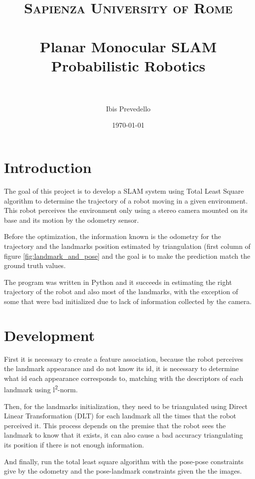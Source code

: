 \documentclass{article}
\title{
\normalfont \normalsize
\textsc{Sapienza University of Rome} \\ [25pt]
\horrule{0.5pt} \\[0.4cm] %
\LARGE Planar Monocular SLAM \\
\large Probabilistic Robotics \\
\horrule{2pt} \\[0.5cm] %
}
\author{Ibis Prevedello}
\date{\normalsize\today}
\begin{document}
\maketitle


\section{Introduction}
The goal of this project is to develop a SLAM system using Total Least Square algorithm to determine the trajectory of a robot moving in a given environment. This robot perceives the environment only using a stereo camera mounted on its base and its motion by the odometry sensor.

Before the optimization, the information known is the odometry for the trajectory and the landmarks position estimated by triangulation (first column of figure \ref{fig:landmark_and_pose} and the goal is to make the prediction match the ground truth values.

The program was written in Python and it succeeds in estimating the right trajectory of the robot and also most of the landmarks, with the exception of some that were bad initialized due to lack of information collected by the camera.


\section{Development}
First it is necessary to create a feature association, because the robot perceives the landmark appearance and do not know its id, it is necessary to determine what id each appearance corresponds to, matching with the descriptors of each landmark using l\textsuperscript{2}-norm.

Then, for the landmarks initialization, they need to be triangulated using Direct Linear Transformation (DLT) \cite{Hartley:2003:MVG:861369} for each landmark all the times that the robot perceived it. This process depends on the premise that the robot sees the landmark to know that it exists, it can also cause a bad accuracy triangulating its position if there is not enough information.

And finally, run the total least square algorithm with the pose-pose constraints give by the odometry and the pose-landmark constraints given the the images.
\end{document}
